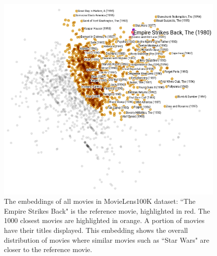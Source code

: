 \documentclass[11pt,twocolumn]{article}
\begin{document}
\begin{figure}[!ht]\centering
	\includegraphics[width=\textwidth]{movies}
	\caption{
		The embeddings of all movies in MovieLens100K dataset:
		``The Empire Strikes Back" is the reference movie, highlighted in red.
		The 1000 closest movies are highlighted in orange.
		A portion of movies have their titles displayed.
		This embedding shows the overall distribution of movies where similar movies such as ``Star Wars" are closer to the reference movie.
	}
	\label{fig:movies}
\end{figure}
\end{document}
